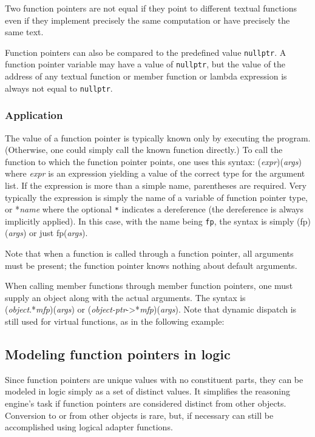 Two function pointers are not equal if they point to
different textual functions even if they implement precisely the
same computation or have precisely the same text.

Function pointers can also be compared to the predefined value \lstinline|nullptr|. A function pointer variable may have
a value of \lstinline|nullptr|, but the value of the address
of any textual function or member function or lambda expression
 is always not
equal to \lstinline|nullptr|.

\subsubsection{Application}

The value of a function pointer is typically known only by
executing the program. (Otherwise, one could simply call the
known function directly.) To call the function to which the
function pointer points, one uses this syntax:
(\emph{expr})(\emph{args}) where \emph{expr} is an expression yielding a value of the correct type for the argument list. If the expression is
more than a simple name, parentheses are required.
Very typically the expression is simply the name of a variable of function pointer type, or *\emph{name} where the optional \lstinline|*| indicates a dereference (the dereference is always implicitly applied).
In this case, with the name being \lstinline|fp|, the syntax is simply (fp)(\emph{args}) or just
fp(\emph{args}).

Note that when a function is called through a function pointer, all arguments must be present; the function pointer knows nothing about
default arguments.

When calling member functions through member function pointers, one must supply an object along with the actual arguments. The syntax is \\
(\emph{object}.*\emph{mfp})(\emph{args}) or
(\emph{object-ptr}->*\emph{mfp})(\emph{args}).
Note that dynamic dispatch is still used for virtual functions,
as in the following example:


\subsection{Modeling function pointers in logic}
\label{sec:modelingfp}

 Since function pointers are unique values with no constituent parts, they can be modeled in logic simply as a set of distinct values. It simplifies the reasoning engine's task if
 function pointers are considered distinct from other objects.
 Conversion to or from other objects is rare, but, if necessary can still be accomplished using logical adapter functions.

